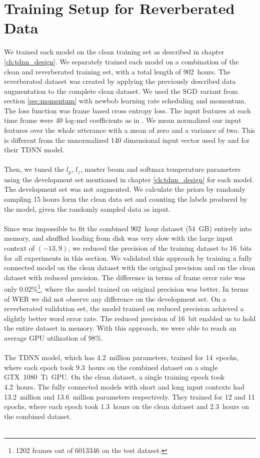 \section{Training Setup for Reverberated Data}
We trained each model on the clean training set as described in chapter \ref{ch:tdnn_design}. We separately trained each model on a combination of the clean and reverberated training set, with a total length of 902~hours. The reverberated dataset was created by applying the previously described data augmentation to the complete clean dataset. We used the SGD variant from section \ref{sec:momentum} with newbob learning rate scheduling and momentum. The loss function was frame based cross entropy loss. The input features at each time frame were 40 log-mel coefficients as in \cite{nguyen20162016}. We mean normalized our input features over the whole utterance with a mean of zero and a variance of two. This is different from the unnormalized 140 dimensional input vector used by \cite{peddinti2015reverberation} and \cite{peddinti2015jhu} for their TDNN model.\\ \\
Then, we tuned the $l_p$, $l_z$, master beam and softmax temperature parameters using the development set mentioned in chapter \ref{ch:tdnn_design} for each model. The development set was not augmented. We calculate the priors by randomly sampling 15 hours form the clean data set and counting the labels produced by the model, given the randomly sampled data as input. \\ \\ 
Since was impossible to fit the combined 902~hour dataset (54~GB) entirely into memory, and shuffled loading from disk was very slow with the large input context of $(-13, 9)$, we reduced the precision of the training dataset to 16~bits for all experiments in this section. We validated this approach by training a fully connected model on the clean dataset with the original precision and on the clean dataset with reduced precision. The difference in terms of frame error rate was only 0.02\%\footnote{1202 frames out of 6013346 on the test dataset.}, where the model trained on original precision was better. In terms of WER we did not observe any difference on the development set. On a reverberated validation set, the model trained on reduced precision achieved a slightly better word error rate. The reduced precision of 16~bit enabled us to hold the entire dataset in memory. With this approach, we were able to reach an average GPU utilization of 98\%. \\ \\
The TDNN model, which has 4.2~million parameters, trained for 14~epochs, where each epoch took 9.3~hours on the combined dataset on a single GTX~1080~Ti~GPU. On the clean dataset, a single training epoch took 4.2~hours. The fully connected models with short and long input contexts had 13.2~million and 13.6~million parameters respectively. They trained for 12 and 11 epochs, where each epoch took 1.3~hours on the clean dataset and 2.3~hours on the combined dataset. \\ \\
